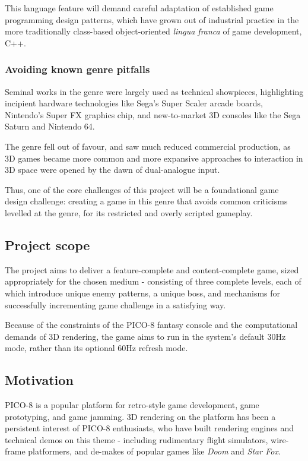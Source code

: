 \documentclass{article}
\begin{document}
This language feature will demand careful adaptation of established game programming design
patterns, which have grown out of industrial practice in the more traditionally class-based
object-oriented \textit{lingua franca} of game development, C++.\cite{nystrom}

\subsubsection*{Avoiding known genre pitfalls}
Seminal works in the genre were largely used as technical showpieces, highlighting incipient
hardware technologies like Sega's Super Scaler arcade boards, Nintendo's Super FX graphics chip, and
new-to-market 3D consoles like the Sega Saturn and Nintendo 64.

The genre fell out of favour, and saw much reduced commercial production, as 3D games became more
common and more expansive approaches to interaction in 3D space were opened by the dawn of
dual-analogue input.

Thus, one of the core challenges of this project will be a foundational game design challenge:
creating a game in this genre that avoids common criticisms levelled at the genre, for its
restricted and overly scripted gameplay.

\subsection*{Project scope}
The project aims to deliver a feature-complete and content-complete game,
sized appropriately for the chosen medium - consisting of three complete
levels, each of which introduce unique enemy patterns, a unique boss, and
mechanisms for successfully incrementing game challenge in a satisfying way.

Because of the constraints of the PICO-8 fantasy console and the computational
demands of 3D rendering, the game aims to run in the system's default 30Hz mode,
rather than its optional 60Hz refresh mode.

\subsection*{Motivation}
PICO-8 is a popular platform for retro-style game development, game prototyping, and game jamming.
3D rendering on the platform has been a persistent interest of PICO-8 enthusiasts, who have built
rendering engines and technical demos on this theme - including rudimentary flight simulators,
wire-frame platformers, and de-makes of popular games like \textit{Doom} and \textit{Star Fox}.
\end{document}

